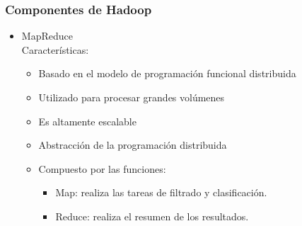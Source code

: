 \documentclass[
10pt, %
aspectratio=169, %
]{beamer}
\begin{document}
	\begin{frame}
		
		\frametitle{Componentes de Hadoop}
		
		\begin{itemize}
			\item MapReduce \\[3mm]
			
			Características: 
			\begin{itemize}
				
				\item Basado en el modelo de programación funcional distribuida \\[2mm]
				
				\item Utilizado para procesar grandes volúmenes \\[2mm]
				
				\item Es altamente escalable \\[2mm]
				
				\item Abstracción de la programación distribuida \\[2mm]
				
				\item Compuesto por las funciones: 
				\begin{itemize}
					\item Map: realiza las tareas de filtrado y clasificación. \\[1mm]
					
					\item Reduce: realiza el resumen de los resultados.
				\end{itemize}
				
			\end{itemize}
			
		\end{itemize}		
		
	\end{frame}
	
\end{document}
